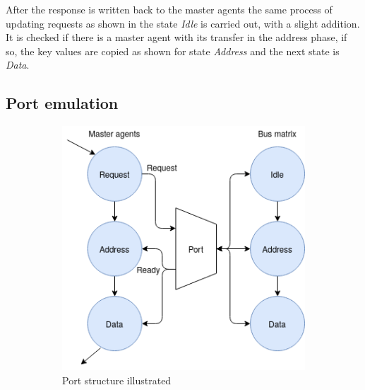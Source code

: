 After the response is written back to the master agents the same process of updating requests as shown in the state \textit{Idle} is carried out, with a slight addition. It is checked if there is a master agent with its transfer in the address phase, if so, the key values are copied as shown for state \textit{Address} and the next state is \textit{Data}.  


\subsection{Port emulation}
\begin{figure}[hbt]
 \centering
 \begin{subfigure}[b]{0.4\linewidth}
 \includegraphics[width=\linewidth]{figs/ESL/port_em.png}
 \caption{Port structure illustrated}
 \end{subfigure}
 \begin{subfigure}[b]{0.3\linewidth}

\end{subfigure}
\end{figure}
